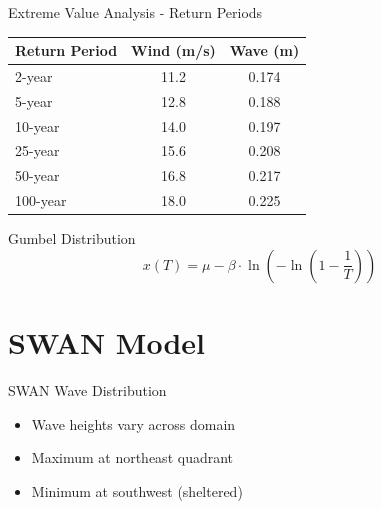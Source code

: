 \documentclass[10pt]{beamer}
\begin{document}
\begin{frame}{Extreme Value Analysis - Return Periods}
\begin{table}
\centering
\begin{tabular}{lcc}
\hline
\textbf{Return Period} & \textbf{Wind (m/s)} & \textbf{Wave (m)} \\
\hline
2-year & 11.2 & 0.174 \\
5-year & 12.8 & 0.188 \\
10-year & 14.0 & 0.197 \\
25-year & 15.6 & 0.208 \\
\alert{50-year} & \alert{16.8} & \alert{0.217} \\
\alert{100-year} & \alert{18.0} & \alert{0.225} \\
\hline
\end{tabular}
\end{table}

\begin{block}{Gumbel Distribution}
\[
x(T) = \mu - \beta \cdot \ln\left(-\ln\left(1 - \frac{1}{T}\right)\right)
\]
\end{block}
\end{frame}

\section{SWAN Model}

\begin{frame}{SWAN Wave Distribution}
\begin{center}
\end{center}

\begin{itemize}
    \item Wave heights vary across domain
    \item Maximum at northeast quadrant
    \item Minimum at southwest (sheltered)
\end{itemize}
\end{frame}
\end{document}
